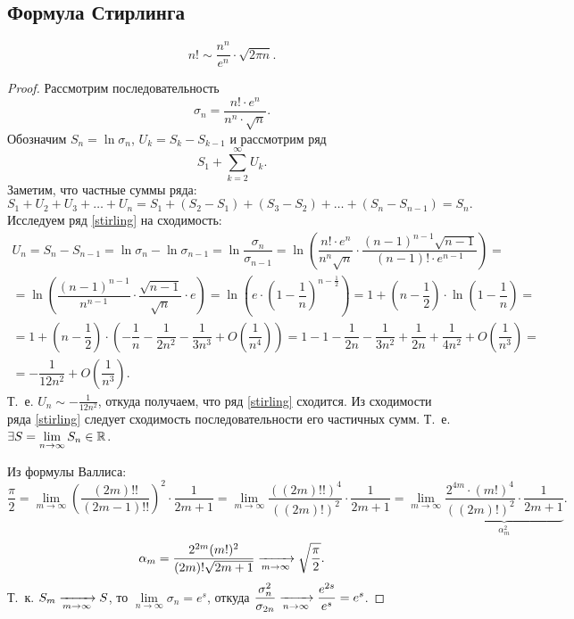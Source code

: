 \documentclass[../../main.tex]{subfiles}
\begin{document}
\subsection{Формула Стирлинга}
\begin{thm}
\[
n! \sim \dfrac{n^n}{e^n}\cdot\sqrt{2\pi n}.
\]
\end{thm}

\begin{proof}
Рассмотрим последовательность
\[\sigma_n = \dfrac{n! \cdot e^n}{n^n \cdot \sqrt{n}}.\]
Обозначим $ S_n = \ln{\sigma_n}$, $U_k = S_k - S_{k-1}$ и рассмотрим ряд
\begin{equation}
\label{stirling} S_1 + \sum\limits_{k=2}^\infty U_k.
\end{equation}
Заметим, что частные суммы ряда:
\[ 
S_1 + U_2 + U_3 + \ldots + U_n = S_1 + \left(S_2 - S_1\right) + 
\left(S_3 - S_2\right) + \ldots + \left(S_n - S_{n - 1}\right) = S_n.
\]
Исследуем ряд \eqref{stirling} на сходимость:
\begin{gather*}
U_n = S_n - S_{n - 1} = \ln\sigma_n - \ln\sigma_{n - 1} = 
\ln\dfrac{\sigma_n}{\sigma_{n - 1}} = \ln\left(\dfrac{n! \cdot 
e^n}{n^n\sqrt{n}}
\cdot \dfrac{(n - 1)^{n - 1}\sqrt{n - 1}}{(n - 1)! \cdot e^{n -1}}\right) =
\\
= \ln\left(\dfrac{(n - 1)^{n - 1}}{n^{n - 1}} \cdot \dfrac{\sqrt{n - 
1}}{\sqrt{n}}
\cdot e\right) = \ln \left(e\cdot \left(1 - \dfrac{1}{n} \right)^{n - 
\frac{1}{2}}\right) = 
1 + \left(n - \dfrac{1}{2} \right) \cdot\ln \left( 1 - \dfrac{1}{n} \right) =
\\
= 1 + \left( n - \dfrac{1}{2} \right)\cdot\left(-\dfrac{1}{n} - \dfrac{1}{2n^2}
- \dfrac{1}{3n^3} + O\left(\dfrac{1}{n^4} \right) \right) = 
1 - 1 - \dfrac{1}{2n} - \dfrac{1}{3n^2} + \dfrac{1}{2n} + \dfrac{1}{4n^2}
+ O\left( \dfrac{1}{n^3} \right) = 
\\
= -\dfrac{1}{12n^2} + O\left( \dfrac{1}{n^3}\right).
\end{gather*}
Т.~е. $U_n \sim -\frac{1}{12n^2}$, откуда получаем, что ряд \eqref{stirling} 
сходится.
Из сходимости ряда \eqref{stirling} следует сходимость
последовательности его частичных сумм. Т.~е. $ \exists 
S = \lim\limits_{n\to\infty} S_n \in \mathbb{R}$.

Из формулы Валлиса:
\[
\dfrac{\pi}{2} = \lim\limits_{m \to \infty} \left( \dfrac{(2m)!!}{(2m - 1)!!}
\right)^2\cdot \dfrac{1}{2m + 1} =
\lim\limits_{m \to \infty} \dfrac{((2m)!!)^4}{((2m)!)^2} \cdot
\dfrac{1}{2m + 1} = \lim\limits_{m \to \infty} 
\underbrace{\dfrac{2^{4m}\cdot(m!)^4}{((2m)!)^2} 
\cdot \dfrac{1}{2m + 1}}_{\alpha_m^2}.
\]
\[
\alpha_m = \dfrac{2^{2m}(m!)^2}{(2m)!\sqrt{2m + 1}} \xrightarrow[m\to\infty]{} 
\sqrt{\dfrac{\pi}{2}}.
\]
Т.~к. $ S_m \xrightarrow[m\to\infty]{} S $, то $ \lim\limits_{n \to \infty} \sigma_n = 
e^s$, откуда 
$\dfrac{\sigma_n^2}{\sigma_{2n}} \xrightarrow[n\to\infty]{}  \dfrac{e^{2s}}{e^s} = e^s 
$.


\end{proof}
\end{document}
